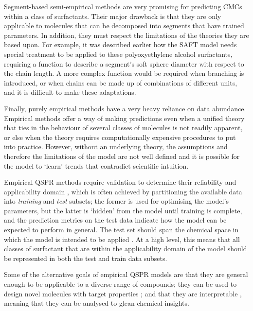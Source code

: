 Segment-based semi-empirical methods are very promising for predicting CMCs
within a class of surfactants. Their major drawback is that they are only
applicable to molecules that can be decomposed into segments that have trained
parameters. In addition, they must respect the limitations of the theories they
are based upon. For example, it was described earlier how the SAFT model needs
special treatment to be applied to these polyoxyethylene alcohol surfactants,
requiring a function to describe a segment's soft sphere diameter with respect
to the chain length. A more complex function would be required when branching is
introduced, or when chains can be made up of combinations of different units,
and it is difficult to make these adaptations.

Finally, purely empirical methods have a very heavy reliance on data abundance.
Empirical methods offer a way of making predictions even when a unified theory
that ties in the behaviour of several classes of molecules is not readily
apparent, or else when the theory requires computationally expensive procedures
to put into practice. However, without an underlying theory, the assumptions and
therefore the limitations of the model are not well defined and it is possible
for the model to `learn' trends that contradict scientific intuition.

Empirical QSPR methods require validation to determine their reliability and
applicability domain
\cite{veerasamyValidationQSARModelsstrategies2011,tropshaBestPracticesQSAR2010,leonardSelectionTrainingTest2006},
which is often achieved by partitioning the available data into \emph{training}
and \emph{test} subsets; the former is used for optimising the model's
parameters, but the latter is `hidden' from the model until training is
complete, and the prediction metrics on the test data indicate how the model can
be expected to perform in general. The test set should span the chemical space
in which the model is intended to be applied
\cite{leonardSelectionTrainingTest2006}. At a high level, this means that all
classes of surfactant that are within the applicability domain of the model
should be represented in both the test and train data subsets.

Some of the alternative goals of empirical QSPR models are that they are general
enough to be applicable to a diverse range of compounds; they can be used to
design novel molecules with target properties
\cite{gantzerInverseQSPRNovoDesign2020,bolboacaMolecularDesignQSARs2013}; and
that they are interpretable \cite{zefirovFragmentalApproachQSPR2002}, meaning
that they can be analysed to glean chemical insights.

